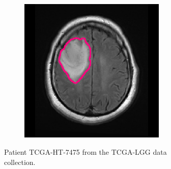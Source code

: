 \begin{subappendices}
\begin{figure}[htbp]
\begin{subfigure}[b]{0.95\textwidth}
\begin{subfigure}[b]{0.215\textwidth}
        \end{subfigure}
        \hfill
        \begin{subfigure}[b]{0.215\textwidth}
        \includegraphics[width=\textwidth, clip, trim=2.5cm 0.5cm 2.5cm 0.5cm]{Figures/Random_segs/FLAIR_TCGA-HT-7475.png}
        \end{subfigure}
        \caption{Patient TCGA-HT-7475 from the TCGA-LGG data collection.}
    \end{subfigure}
    \begin{subfigure}[b]{0.95\textwidth}
        \centering
        \hfill
        \begin{subfigure}[b]{0.215\textwidth}

\end{subfigure}
\end{subfigure}
\end{figure}
\end{subappendices}
